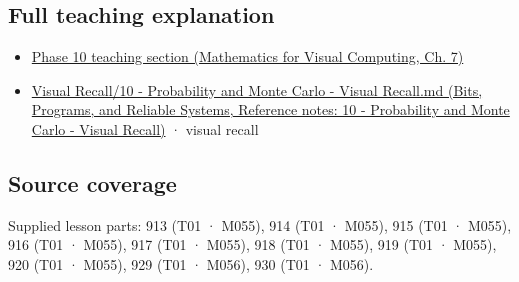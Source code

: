 \subsection{Full teaching explanation}\label{appendix-54c383df9992-full-teaching-explanation}

\hypertarget{appendix-54c383df9992-full-teaching-explanation}{}

\begin{itemize}
\tightlist
\item
  \href{../02-Mathematics-for-Visual-Computing/main.pdf\#nameddest=02-foundations-ii-ch023-expected-values-describe-centers-covariance-describes-dependence}{Phase 10 teaching section (Mathematics for Visual Computing, Ch. 7)}
\item
  \href{../01-Bits-Programs-and-Reliable-Systems/main.pdf\#nameddest=appendix-cb5af353ef77}{Visual Recall/10 - Probability and Monte Carlo - Visual Recall.md (Bits, Programs, and Reliable Systems, Reference notes: 10 - Probability and Monte Carlo - Visual Recall)} · visual recall
\end{itemize}

\subsection{Source coverage}\label{appendix-54c383df9992-source-coverage}

\hypertarget{appendix-54c383df9992-source-coverage}{}

Supplied lesson parts: 913 (T01 · M055), 914 (T01 · M055), 915 (T01 · M055), 916 (T01 · M055), 917 (T01 · M055), 918 (T01 · M055), 919 (T01 · M055), 920 (T01 · M055), 929 (T01 · M056), 930 (T01 · M056).
